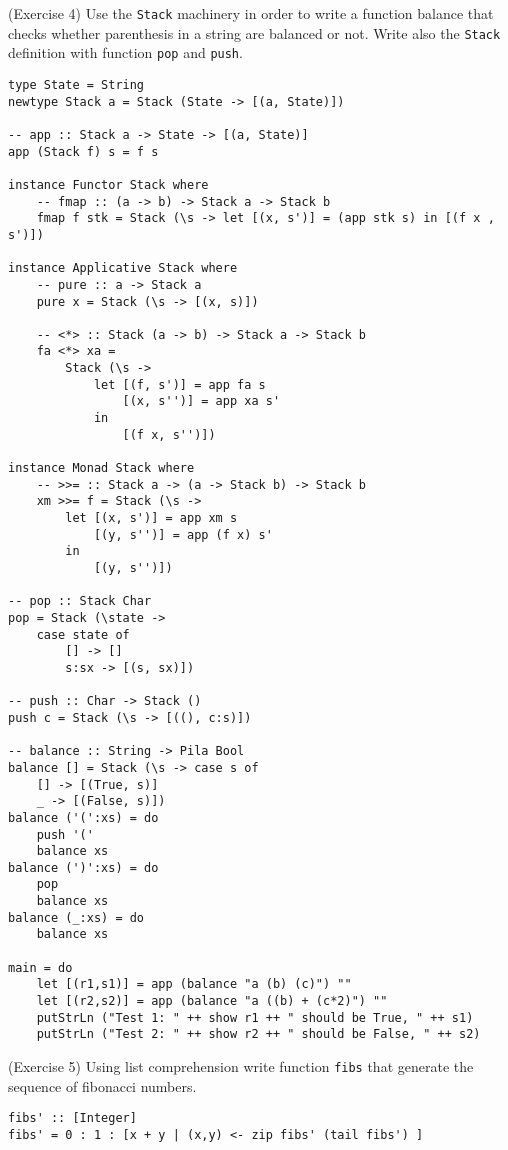 \documentclass[12pt,a4paper,oneside]{book}
\begin{document}
\begin{exercise}{(Exercise 4)}
	Use the \texttt{Stack} machinery in order to write a function balance that checks whether parenthesis in a string are balanced or not. Write also the \texttt{Stack} definition with function \texttt{pop} and \texttt{push}.
\end{exercise}

\begin{verbatim}
type State = String
newtype Stack a = Stack (State -> [(a, State)])

-- app :: Stack a -> State -> [(a, State)]
app (Stack f) s = f s

instance Functor Stack where
    -- fmap :: (a -> b) -> Stack a -> Stack b
    fmap f stk = Stack (\s -> let [(x, s')] = (app stk s) in [(f x , s')])

instance Applicative Stack where
    -- pure :: a -> Stack a
    pure x = Stack (\s -> [(x, s)])

    -- <*> :: Stack (a -> b) -> Stack a -> Stack b
    fa <*> xa =
        Stack (\s -> 
            let [(f, s')] = app fa s
                [(x, s'')] = app xa s'
            in 
                [(f x, s'')])

instance Monad Stack where
    -- >>= :: Stack a -> (a -> Stack b) -> Stack b
    xm >>= f = Stack (\s ->
        let [(x, s')] = app xm s
            [(y, s'')] = app (f x) s'
        in 
            [(y, s'')])

-- pop :: Stack Char
pop = Stack (\state ->
    case state of
        [] -> []
        s:sx -> [(s, sx)])

-- push :: Char -> Stack ()
push c = Stack (\s -> [((), c:s)])

-- balance :: String -> Pila Bool
balance [] = Stack (\s -> case s of
    [] -> [(True, s)]
    _ -> [(False, s)])
balance ('(':xs) = do
    push '('
    balance xs
balance (')':xs) = do
    pop
    balance xs
balance (_:xs) = do
    balance xs

main = do
    let [(r1,s1)] = app (balance "a (b) (c)") "" 
    let [(r2,s2)] = app (balance "a ((b) + (c*2)") ""
    putStrLn ("Test 1: " ++ show r1 ++ " should be True, " ++ s1)
    putStrLn ("Test 2: " ++ show r2 ++ " should be False, " ++ s2)
\end{verbatim}

\begin{exercise}{(Exercise 5)}
	Using list comprehension write function \texttt{fibs} that generate the sequence of fibonacci numbers.
\end{exercise}

\begin{verbatim}
fibs' :: [Integer]
fibs' = 0 : 1 : [x + y | (x,y) <- zip fibs' (tail fibs') ]
\end{verbatim}
\end{document}

